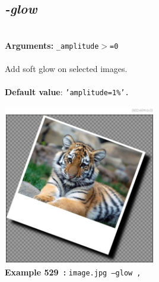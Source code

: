 \documentclass[a4paper,11pt,twoside]{book}
\begin{document}
\subsection{\emph{-glow} }\vspace*{-0.5em}
~\\\textbf{Arguments: } 
{\small \texttt{\_amplitude$>$=0}}\\~\\
Add soft glow on selected images.
~\\~\\\textbf{Default value}: {\small \texttt{'amplitude=1\%'.}}
\begin{center}\includegraphics[keepaspectratio=true,height=7cm,width=\textwidth]{img/gmic_def529.jpg}\\
{\footnotesize \textbf{Example 529~:} \texttt{image.jpg --glow ,}}
\end{center}
\end{document}
